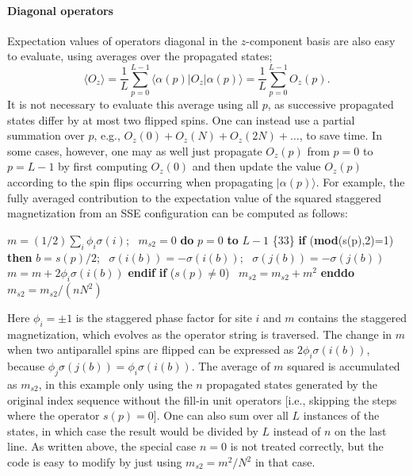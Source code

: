 \documentclass[draft,numberedheadings]{aipproc}
\newcommand{\code}{\null\vskip-2mm\noindent}
\newcommand{\br}{\hfill\break}
\newcommand{\cia}{\null\hskip5mm}
\newcommand{\cib}{\null\hskip10mm}
\newcommand{\cic}{\null\hskip15mm}
\begin{document}
\paragraph{Diagonal operators}

Expectation values of operators diagonal in the $z$-component basis are also easy to evaluate, using averages over the propagated states;
\begin{equation}
\langle O_z\rangle = \frac{1}{L}\sum_{p=0}^{L-1} \langle \alpha(p)|O_z|\alpha(p)\rangle 
= \frac{1}{L}\sum_{p=0}^{L-1} O_z(p).
\label{ozsseaverage}
\end{equation}
It is not necessary to evaluate this average using all $p$, as successive propagated states differ by at most two flipped spins. One can instead use a partial 
summation over $p$, e.g., $O_z(0)+O_z(N)+O_z(2N)+\ldots$, to save time. In some cases, however, one may as well just propagate $O_z(p)$ from $p=0$ to $p=L-1$ 
by first computing $O_z(0)$ and then update the value $O_z(p)$ according to the spin flips occurring when propagating $|\alpha(p)\rangle$. For example, 
the fully averaged contribution to the expectation value of the squared staggered magnetization from an SSE configuration can be computed as follows:

{\code
\cia       $m=(1/2)\sum_i \phi_i\sigma(i)$;~ $m_{s2}=0$ \br       
\cia       {\bf do} $p=0$ {\bf to} $L-1$ \hfill   \{33\} \break 
\cib            {\bf if} ({\bf mod}(s(p),2)=1) {\bf then} \br
\cic                 $b=s(p)/2$;~ $\sigma(i(b))=-\sigma(i(b))$;~ $\sigma(j(b))=-\sigma(j(b))$ \br
\cic                 $m=m+2\phi_i\sigma(i(b))$  \br
\cib            {\bf endif} \br
\cib            {\bf if} ($s(p)\not=0$)~  $m_{s2}=m_{s2}+m^2$ \br
\cia        {\bf enddo} \br
\cia        $m_{s2}=m_{s2}/(nN^2)$
\code}

\noindent
Here $\phi_i = \pm 1$ is the staggered phase factor for site $i$ and $m$ contains the staggered magnetization, which 
evolves as the operator string is traversed. The change in $m$ when two antiparallel spins are flipped can be expressed as $2\phi_i\sigma(i(b))$, because 
$\phi_j\sigma(j(b))=\phi_i\sigma(i(b))$. The average of $m$ squared is accumulated as $m_{s2}$, in this example only using the $n$ propagated states generated 
by the original index sequence without the fill-in unit operators [i.e., skipping the steps where the operator $s(p)=0$]. One can also sum over all $L$ 
instances of the states, in which case the result would be divided by $L$ instead of $n$ on the last line. As written above, the special case $n=0$ is not 
treated correctly, but the code is easy to modify by just using $m_{s2}=m^2/N^2$ in that case.
\end{document}
